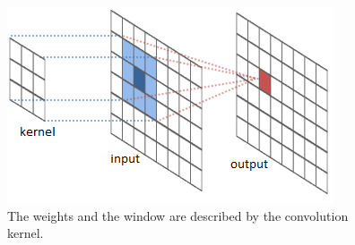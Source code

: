 \begin{figure}[H]	\includegraphics[width=0.5\linewidth]{images/kernel_convolution.png} 
    \centering

	\caption{The weights and the window are described by the convolution kernel.}

	\label{fig:kernel}
\end{figure}